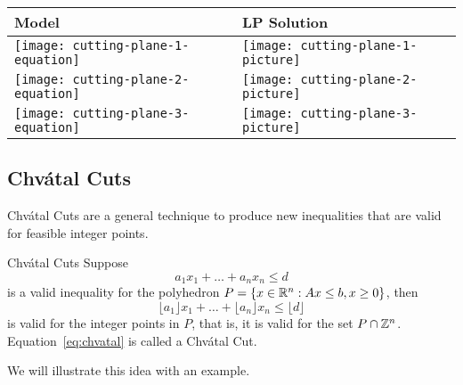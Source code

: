 \documentclass[../open-optimization/open-optimization.tex]{subfiles}
\begin{document}
\begin{table}[h]
\centering\begin{tabular}{>{\centering\arraybackslash}m{5cm}>{\centering\arraybackslash}m{10cm}}
 \hline
\textbf{Model} & \textbf{LP Solution} \\\hline \hline
 \texttt{[image: cutting-plane-1-equation]} &
\texttt{[image: cutting-plane-1-picture]}\\
\texttt{[image: cutting-plane-2-equation]} &
\texttt{[image: cutting-plane-2-picture]}\\
\texttt{[image: cutting-plane-3-equation]} &
\texttt{[image: cutting-plane-3-picture]}\\
\hline
 \end{tabular}
\end{table}


\subsection{Chv\'atal Cuts}


Chv\'atal Cuts are a general technique to produce new inequalities that are valid for feasible integer points.  


\begin{general}{Chv\'atal Cuts}{}
Suppose 
\begin{equation}
a_1 x_1 + \dots + a_n x_n \leq d
\end{equation}
is a valid inequality for the polyhedron $P = \{ x \in {\mathbb{R}}^n : Ax \leq b, x \geq 0\}$, then 
\begin{equation}
\label{eq:chvatal}
\lfloor a_1\rfloor x_1 + \dots + \lfloor a_n\rfloor  x_n \leq \lfloor d\rfloor
\end{equation}
is valid for the integer points in $P$, that is, it is valid for the set $P \cap {\mathbb{Z}}^n$.  Equation~\eqref{eq:chvatal} is called a Chv\'atal Cut.
\end{general}


We will illustrate this idea with an example.
\end{document}
